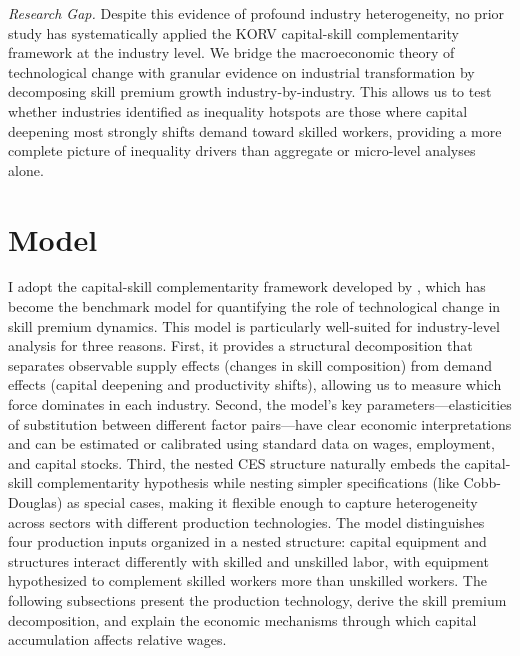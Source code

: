 \documentclass[12pt]{article}
\begin{document}
\textit{Research Gap.}
Despite this evidence of profound industry heterogeneity, no prior study has systematically applied the KORV capital-skill complementarity framework at the industry level. We bridge the macroeconomic theory of technological change with granular evidence on industrial transformation by decomposing skill premium growth industry-by-industry. This allows us to test whether industries identified as inequality hotspots are those where capital deepening most strongly shifts demand toward skilled workers, providing a more complete picture of inequality drivers than aggregate or micro-level analyses alone.


\section{Model}\label{sec:model}

I adopt the capital-skill complementarity framework developed by \citet{krusell2000capital}, which has become the benchmark model for quantifying the role of technological change in skill premium dynamics. This model is particularly well-suited for industry-level analysis for three reasons. First, it provides a structural decomposition that separates observable supply effects (changes in skill composition) from demand effects (capital deepening and productivity shifts), allowing us to measure which force dominates in each industry. Second, the model's key parameters---elasticities of substitution between different factor pairs---have clear economic interpretations and can be estimated or calibrated using standard data on wages, employment, and capital stocks. Third, the nested CES structure naturally embeds the capital-skill complementarity hypothesis while nesting simpler specifications (like Cobb-Douglas) as special cases, making it flexible enough to capture heterogeneity across sectors with different production technologies. The model distinguishes four production inputs organized in a nested structure: capital equipment and structures interact differently with skilled and unskilled labor, with equipment hypothesized to complement skilled workers more than unskilled workers. The following subsections present the production technology, derive the skill premium decomposition, and explain the economic mechanisms through which capital accumulation affects relative wages.
\end{document}
